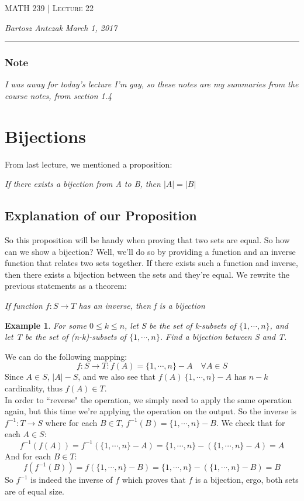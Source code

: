 \documentclass{report}
\newcommand{\lectureNum}{22}
\newcommand{\curDate}{March 1, 2017}
\newcommand{\course}{MATH 239}
\newtheorem{ex}{Example}[section]
\begin{document}
\begin{center}
\begin{Large}
\textsc{\course{} | Lecture \lectureNum{}}
\end{Large}
\end{center} 
\noindent \textit{Bartosz Antczak} \hfill
\textit{\curDate{}}
\rule{\textwidth}{0.4pt}
\subsubsection{Note}
\textit{I was away for today's lecture I'm gay, so these notes are my summaries from the course notes, from section 1.4}
\section{Bijections}
From last lecture, we mentioned a proposition:
\begin{center}
\textit{If there exists a bijection from A to B, then $|A| = |B|$}
\end{center}
\subsection{Explanation of our Proposition}
So this proposition will be handy when proving that two sets are equal. So how can we show a bijection? Well, we'll do so by providing a function and an inverse function that relates two sets together. If there exists such a function and inverse, then there exists a bijection between the sets and they're equal. We rewrite the previous statements as a theorem:
\begin{center}
\textit{If function $f : S \rightarrow T$ has an inverse, then f is a bijection}
\end{center}
\begin{ex}
For some $0 \leq k \leq n$, let S be the set of k-subsets of $\{1, \cdots, n\}$, and let T be the set of (n-k)-subsets of $\{1, \cdots, n\}$. Find a bijection between S and T.
\end{ex}
We can do the following mapping:
$$f: S \rightarrow T : f(A) = \{1, \cdots, n\} - A \quad \forall A \in S$$
Since $A \in S$, $|A| - S$, and we also see that $f(A) \ \{1, \cdots, n\} - A$ has $n-k$ cardinality, thus $f(A) \in T$.\\In order to ``reverse" the operation, we simply need to apply the same operation again, but this time we're applying the operation on the output. So the inverse is $f^{-1}: T \rightarrow S$ where for each $B \in T$, $f^{-1}(B) = \{1, \cdots, n\} - B$. We check that for each $A \in S$:
$$f^{-1}(f(A)) = f^{-1}(\{1, \cdots, n\} - A) = \{1, \cdots, n\} - (\{1, \cdots, n\}- A) = A$$
And for each $B \in T$:
$$f(f^{-1}(B)) = f(\{1, \cdots, n\} - B) = \{1, \cdots, n\} - (\{1, \cdots, n\}- B) = B$$
So $f^{-1}$ is indeed the inverse of $f$ which proves that $f$ is a bijection, ergo, both sets are of equal size.
\end{document}
